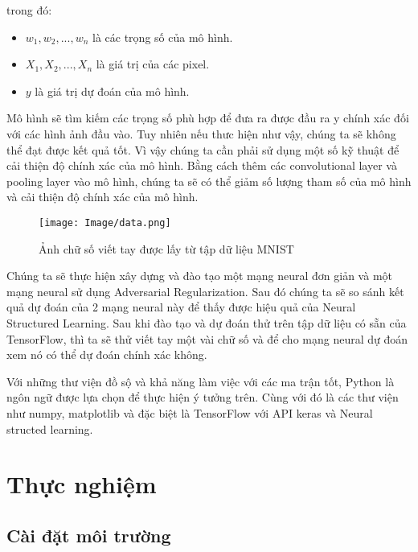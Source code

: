 trong đó:
\begin{itemize}
    \item $w_1, w_2, ..., w_n$ là các trọng số của mô hình.
    \item $X_1, X_2, ..., X_n$ là giá trị của các pixel.
    \item $y$ là giá trị dự đoán của mô hình.
\end{itemize}


Mô hình sẽ tìm kiếm các trọng số phù hợp để đưa ra được đầu ra y chính xác đối với các hình ảnh đầu vào.
Tuy nhiên nếu thưc hiện như vậy, chúng ta sẽ không thể đạt được kết quả tốt. Vì vậy chúng ta cần phải sử dụng một số kỹ thuật để cải thiện độ chính xác của mô hình.
Bằng cách thêm các convolutional layer và pooling layer vào mô hình, chúng ta sẽ có thể giảm số lượng tham số của mô hình và cải thiện độ chính xác của mô hình.

\begin{figure}[h!]
    \centering
    \texttt{[image: Image/data.png]}
    \caption{Ảnh chữ số viết tay được lấy từ tập dữ liệu MNIST}
    \label{Hình 2.1: GẢnh chữ số viết tay được lấy từ tập dữ liệu MNIST}
\end{figure}


Chúng ta sẽ thực hiện xây dựng và đào tạo một mạng neural đơn giản và một mạng neural sử dụng Adversarial Regularization. Sau đó chúng ta sẽ so sánh kết quả 
dự đoán của 2 mạng neural này để thấy được hiệu quả của Neural Structured Learning. Sau khi đào tạo và dự đoán thử trên tập dữ liệu có sẵn của TensorFlow, thì
ta sẽ thử viết tay một vài chữ số và để cho mạng neural dự đoán xem nó có thể dự đoán chính xác không.

Với những thư viện đồ sộ và khả năng làm việc với các ma trận tốt, Python là ngôn ngữ được lựa chọn để thực hiện ý tưởng trên. Cùng với đó là các thư viện như numpy, matplotlib và
đặc biệt là TensorFlow với API keras và Neural structed learning.






\section{Thực nghiệm}

\subsection{Cài đặt môi trường}

